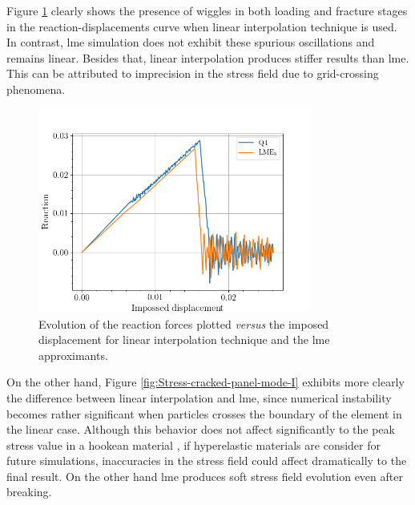 \documentclass[preprint,12pt,a4paper]{elsarticle}
\begin{document}
Figure \ref{fig:Reactions-cracked-panel-mode-I} clearly shows the
presence of wiggles in both loading and fracture stages
in the reaction-displacements curve when linear interpolation
technique is used. In contrast, \acrshort{lme} simulation does not
exhibit these spurious oscillations and remains linear. Besides that,
linear interpolation produces stiffer results than
\acrshort{lme}. This can be attributed to imprecision in the stress
field due to grid-crossing phenomena.\\
\begin{figure}
  \centering
  \includegraphics[width=0.8\textwidth]{Figure-Reactions-Mode-I}
  \caption{Evolution of the reaction forces plotted \textit{versus}
    the imposed displacement for linear interpolation technique and
    the \acrshort{lme} approximants.}
  \label{fig:Reactions-cracked-panel-mode-I}
\end{figure}
On the other hand, Figure \ref{fig:Stress-cracked-panel-mode-I}
exhibits more clearly the difference between linear interpolation and
\acrshort{lme}, since numerical instability becomes rather significant
when particles crosses the boundary of the element in the linear
case. Although this behavior does not affect significantly to the peak
stress value in a hookean material \cite{Zhang_EE_2020}, if
hyperelastic materials are consider for future simulations,
inaccuracies in the stress field could affect dramatically to the
final result. On the other hand \acrshort{lme} produces soft stress
field evolution even after breaking.
\end{document}
